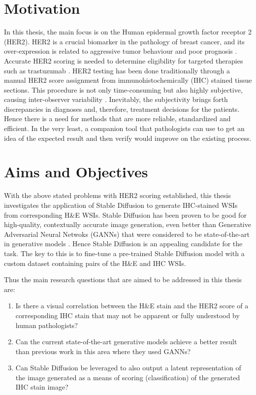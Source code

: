 \section{Motivation}

In this thesis, the main focus is on the Human epidermal growth factor receptor 2 (HER2). HER2 is a crucial biomarker in the pathology of breast cancer, and its over-expression is related to aggressive tumor behaviour and poor prognosis \parencite{Slamon1987HumanOncogene}. Accurate HER2 scoring is needed to determine eligibility for targeted therapies such as trastuzumab \parencite{Slamon2001UseHER2}. HER2 testing has been done traditionally through a manual HER2 score assignment from immunohistochemically (IHC) stained tissue sections. This procedure is not only time-consuming but also highly subjective, causing inter-observer variability \parencite{Wolff2013RecommendationsUpdate.}. Inevitably, the subjectivity brings forth discrepancies in diagnoses and, therefore, treatment decisions for the patients. Hence there is a need for methods that are more reliable, standardized and efficient. In the very least, a companion tool that pathologists can use to get an idea of the expected result and then verify would improve on the existing process. 

\section{Aims and Objectives} 

With the above stated problems with HER2 scoring established, this thesis investigates the application of Stable Diffusion \parencite{Rombach2021High-ResolutionModels} to generate IHC-stained WSIs from corresponding H\&E WSIs. Stable Diffusion has been proven to be good for high-quality, contextually accurate image generation, even better than Generative Adversarial Neural Netwoks (GANNs) that were considered to be state-of-the-art in generative models \parencite{Baranchuk2021Label-EfficientModels}. Hence Stable Diffusion is an appealing candidate for the task. The key to this is to fine-tune a pre-trained Stable Diffusion model with a custom dataset containing pairs of the H\&E and IHC WSIs. 

Thus the main research questions that are aimed to be addressed in this thesis are:

\begin{enumerate}

\item Is there a visual correlation between the H\&E stain and the HER2 score of a corresponding IHC stain that may not be apparent or fully understood by human pathologists?

\item Can the current state-of-the-art generative models achieve a better result than previous work in this area where they used GANNs?

\item Can Stable Diffusion be leveraged to also output a latent representation of the image generated as a means of scoring (classification) of the generated IHC stain image?
 

\end{enumerate}

